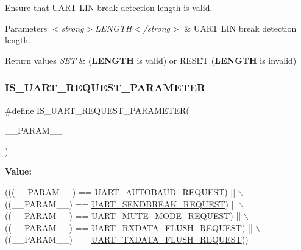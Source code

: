 Ensure that U\+A\+RT L\+IN break detection length is valid. 


\begin{DoxyParams}{Parameters}
{\em $<$strong$>$\+L\+E\+N\+G\+T\+H$<$/strong$>$} & U\+A\+RT L\+IN break detection length. \\
\hline
\end{DoxyParams}

\begin{DoxyRetVals}{Return values}
{\em S\+ET} & ({\bfseries L\+E\+N\+G\+TH} is valid) or R\+E\+S\+ET ({\bfseries L\+E\+N\+G\+TH} is invalid) \\
\hline
\end{DoxyRetVals}
\mbox{\label{group___u_a_r_t_ex___private___macros_ga5cf62c9c598753525888cc7c24be3cb2}} 
\subsubsection{\texorpdfstring{I\+S\+\_\+\+U\+A\+R\+T\+\_\+\+R\+E\+Q\+U\+E\+S\+T\+\_\+\+P\+A\+R\+A\+M\+E\+T\+ER}{IS\_UART\_REQUEST\_PARAMETER}}
{\footnotesize\ttfamily \#define I\+S\+\_\+\+U\+A\+R\+T\+\_\+\+R\+E\+Q\+U\+E\+S\+T\+\_\+\+P\+A\+R\+A\+M\+E\+T\+ER(\begin{DoxyParamCaption}\item[{}]{\+\_\+\+\_\+\+P\+A\+R\+A\+M\+\_\+\+\_\+ }\end{DoxyParamCaption})}

{\bfseries Value\+:}
\begin{DoxyCode}
(((\_\_PARAM\_\_) == \hyperlink{group___u_a_r_t___request___parameters_ga8cdce81a934ab7d0c2eecb4d85300d4e}{UART\_AUTOBAUD\_REQUEST})     || \(\backslash\)
                                              ((\_\_PARAM\_\_) == 
      \hyperlink{group___u_a_r_t___request___parameters_ga52ced88a9f4ce90f3725901cf91f38b3}{UART\_SENDBREAK\_REQUEST})    || \(\backslash\)
                                              ((\_\_PARAM\_\_) == 
      \hyperlink{group___u_a_r_t___request___parameters_gadd5f511803928fd042f7fc6ef99f9cfb}{UART\_MUTE\_MODE\_REQUEST})    || \(\backslash\)
                                              ((\_\_PARAM\_\_) == 
      \hyperlink{group___u_a_r_t___request___parameters_gaf2ee2d4b1bdcbc7772ddc0da89566936}{UART\_RXDATA\_FLUSH\_REQUEST}) || \(\backslash\)
                                              ((\_\_PARAM\_\_) == 
      \hyperlink{group___u_a_r_t___request___parameters_gafecbd800f456ed666a42ac0842cd2c4b}{UART\_TXDATA\_FLUSH\_REQUEST}))
\end{DoxyCode}


